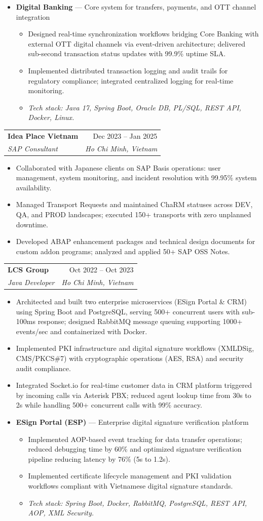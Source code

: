 \documentclass[letterpaper,11pt]{article}
\makeatletter
\newcommand{\resumeItem}[1]{
  \item\small{{#1\vspace{-1pt}}}
}
\newcommand{\resumeSubheading}[4]{
  \vspace{-2pt}\item
    \begin{tabular*}{0.97\textwidth}[t]{l@{\extracolsep{\fill}}r}
      \textbf{\small #1} & \small #2 \\
      \textit{\small\color{accent} #3} & \textit{\small #4} \\
    \end{tabular*}\vspace{-5pt}
}
\newcommand{\techStack}[1]{%
  \vspace{1pt}
  {\small\textit{Tech stack: #1}}%
}
\newcommand{\resumeItemListStart}{%
  \begin{itemize}[leftmargin=0.22in, topsep=2pt, parsep=0pt, partopsep=0pt, itemsep=2pt]%
}
\newcommand{\resumeItemListEnd}{\end{itemize}\vspace{-2pt}}
\newenvironment{projectBlock}[2]{%
  \vspace{-4pt}
  \begin{itemize}[leftmargin=0.22in, label={}, topsep=0pt, parsep=0pt, itemsep=0pt]
  \item \small\textbf{#1} --- #2
  \begin{itemize}[leftmargin=0.18in, topsep=1pt, parsep=0pt, itemsep=1pt]
}{%
  \end{itemize}
  \end{itemize}
  \vspace{-2pt}
}
\makeatother
\begin{document}
  \begin{projectBlock}{Digital Banking}{Core system for transfers, payments, and OTT channel integration}
    \resumeItem{Designed real-time synchronization workflows bridging Core Banking with external OTT digital channels via event-driven architecture; delivered sub-second transaction status updates with 99.9\% uptime SLA.}
    \resumeItem{Implemented distributed transaction logging and audit trails for regulatory compliance; integrated centralized logging for real-time monitoring.}
    \item \techStack{Java 17, Spring Boot, Oracle DB, PL/SQL, REST API, Docker, Linux.}
  \end{projectBlock}

  \resumeSubheading
    {Idea Place Vietnam}{Dec 2023 -- Jan 2025}
    {SAP Consultant}{Ho Chi Minh, Vietnam}
  \resumeItemListStart
    \resumeItem{Collaborated with Japanese clients on SAP Basis operations: user management, system monitoring, and incident resolution with 99.95\% system availability.}
    \resumeItem{Managed Transport Requests and maintained ChaRM statuses across DEV, QA, and PROD landscapes; executed 150+ transports with zero unplanned downtime.}
    \resumeItem{Developed ABAP enhancement packages and technical design documents for custom addon programs; analyzed and applied 50+ SAP OSS Notes.}
  \resumeItemListEnd

  \resumeSubheading
    {LCS Group}{Oct 2022 -- Oct 2023}
    {Java Developer}{Ho Chi Minh, Vietnam}
  \resumeItemListStart
    \resumeItem{Architected and built two enterprise microservices (ESign Portal \& CRM) using Spring Boot and PostgreSQL, serving 500+ concurrent users with sub-100ms response; designed RabbitMQ message queuing supporting 1000+ events/sec and containerized with Docker.}
    \resumeItem{Implemented PKI infrastructure and digital signature workflows (XMLDSig, CMS/PKCS\#7) with cryptographic operations (AES, RSA) and security audit compliance.}
    \resumeItem{Integrated Socket.io for real-time customer data in CRM platform triggered by incoming calls via Asterisk PBX; reduced agent lookup time from 30s to 2s while handling 500+ concurrent calls with 99\% accuracy.}
  \resumeItemListEnd

  \begin{projectBlock}{ESign Portal (ESP)}{Enterprise digital signature verification platform}
    \resumeItem{Implemented AOP-based event tracking for data transfer operations; reduced debugging time by 60\% and optimized signature verification pipeline reducing latency by 76\% (5s to 1.2s).}
    \resumeItem{Implemented certificate lifecycle management and PKI validation workflows compliant with Vietnamese digital signature standards.}
    \item \techStack{Spring Boot, Docker, RabbitMQ, PostgreSQL, REST API, AOP, XML Security.}
  \end{projectBlock}
\end{document}
